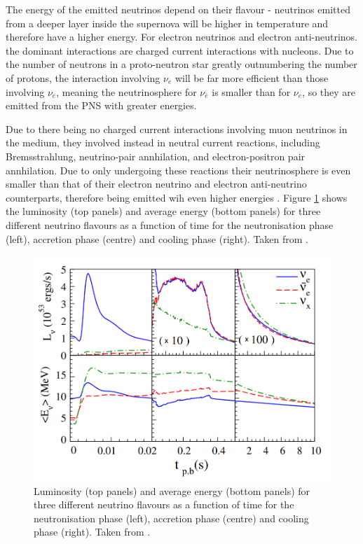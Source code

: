 The energy of the emitted neutrinos depend on their flavour - neutrinos emitted from a deeper layer inside the supernova will be higher in temperature and therefore have a higher energy. For electron neutrinos and electron anti-neutrinos. the dominant interactions are charged current interactions with nucleons. Due to the number of neutrons in a proto-neutron star greatly outnumbering the number of protons, the interaction involving $\nu_{e}$ will be far more efficient than those involving $\nu_{\bar{e}}$, meaning the neutrinosphere for $\nu_{\bar{e}}$ is smaller than for $\nu_{e}$, so they are emitted from the PNS with greater energies. 

Due to there being no charged current interactions involving muon neutrinos in the medium, they involved instead in neutral current reactions, including Bremsstrahlung, neutrino-pair annhilation, and electron-positron pair annhilation. Due to only undergoing these reactions their neutrinosphere is even smaller than that of their electron neutrino and electron anti-neutrino counterparts, therefore being emitted wih even higher energies \cite{nagakura_non-thermal_2021}. Figure \ref{fig:ccsn_nu_flavor_energy} shows the luminosity (top panels) and average energy (bottom panels) for three different neutrino flavours as a function of time for the neutronisation phase (left), accretion phase (centre) and cooling phase (right). Taken from \cite{chakraborty_observing_2014}.

\begin{figure}
    \includegraphics[width=\textwidth]{Figures/ccsn_nu_flavor_energy}
    \caption{Luminosity (top panels) and average energy (bottom panels) for three different neutrino flavours as a function of time for the neutronisation phase (left), accretion phase (centre) and cooling phase (right). Taken from \cite{chakraborty_observing_2014}. }
    \label{fig:ccsn_nu_flavor_energy}
\end{figure}



